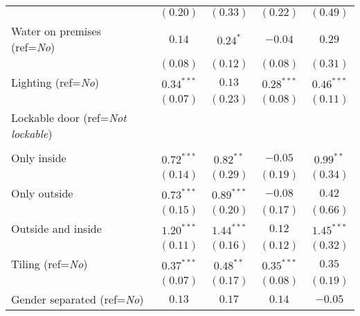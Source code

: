 \begin{center}
\begin{footnotesize}
\begin{ThreePartTable}
\begin{longtable}{l@{} c@{} c@{} c@{} c@{}}
                                                           & $(0.20)$      & $(0.33)$      & $(0.22)$      & $(0.49)$     \\
Water on premises (ref=\textit{No})                        & $0.14$        & $0.24^{*}$    & $-0.04$       & $0.29$       \\
                                                           & $(0.08)$      & $(0.12)$      & $(0.08)$      & $(0.31)$     \\
Lighting (ref=\textit{No})                                 & $0.34^{***}$  & $0.13$        & $0.28^{***}$  & $0.46^{***}$ \\
                                                           & $(0.07)$      & $(0.23)$      & $(0.08)$      & $(0.11)$     \\
Lockable door (ref=\textit{Not lockable})                  &               &               &               &              \\
                                                           &               &               &               &              \\
\quad Only inside                                          & $0.72^{***}$  & $0.82^{**}$   & $-0.05$       & $0.99^{**}$  \\
                                                           & $(0.14)$      & $(0.29)$      & $(0.19)$      & $(0.34)$     \\
\quad Only outside                                         & $0.73^{***}$  & $0.89^{***}$  & $-0.08$       & $0.42$       \\
                                                           & $(0.15)$      & $(0.20)$      & $(0.17)$      & $(0.66)$     \\
\quad Outside and inside                                   & $1.20^{***}$  & $1.44^{***}$  & $0.12$        & $1.45^{***}$ \\
                                                           & $(0.11)$      & $(0.16)$      & $(0.12)$      & $(0.32)$     \\
Tiling (ref=\textit{No})                                   & $0.37^{***}$  & $0.48^{**}$   & $0.35^{***}$  & $0.35$       \\
                                                           & $(0.07)$      & $(0.17)$      & $(0.08)$      & $(0.19)$     \\
Gender separated (ref=\textit{No})                         & $0.13$        & $0.17$        & $0.14$        & $-0.05$      \\

\end{longtable}
\end{ThreePartTable}
\end{footnotesize}
\end{center}
